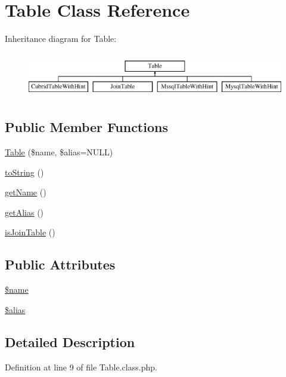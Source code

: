 \hypertarget{classTable}{}\section{Table Class Reference}
\label{classTable}
Inheritance diagram for Table\+:\begin{figure}[H]
\begin{center}
\leavevmode
\includegraphics[height=2.000000cm]{classTable}
\end{center}
\end{figure}
\subsection*{Public Member Functions}
\begin{DoxyCompactItemize}
\item 
\hyperlink{classTable_ab93dfd4a90901959b57787798162b318}{Table} (\$name, \$alias=N\+U\+LL)
\item 
\hyperlink{classTable_a19994c4700a5cf54951216f7782c08d0}{to\+String} ()
\item 
\hyperlink{classTable_a8e2ad8a066449c8fedf8f3a9192db355}{get\+Name} ()
\item 
\hyperlink{classTable_ad278f4d13845b8b52a4496f6c5f0e47d}{get\+Alias} ()
\item 
\hyperlink{classTable_a4d82b6895fe7a4af2ff50dddc955d075}{is\+Join\+Table} ()
\end{DoxyCompactItemize}
\subsection*{Public Attributes}
\begin{DoxyCompactItemize}
\item 
\hyperlink{classTable_a7c7f5d88257a02dd1fbeee22a77c7f39}{\$name}
\item 
\hyperlink{classTable_ac4290933d902bdb3b69a32ebe964df02}{\$alias}
\end{DoxyCompactItemize}


\subsection{Detailed Description}


Definition at line 9 of file Table.\+class.\+php.



